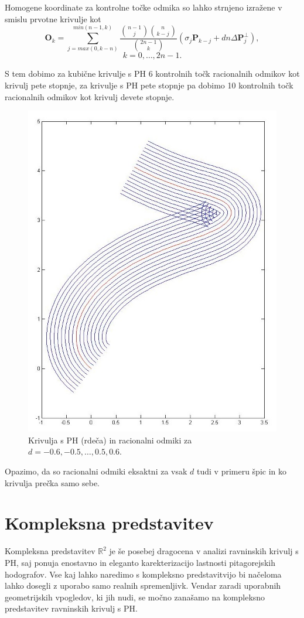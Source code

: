 \documentclass[a4paper]{IEEEtran}
\begin{document}
	Homogene koordinate za kontrolne točke odmika so lahko strnjeno izražene v smislu prvotne krivulje kot
	$$\textbf{O}_k =\sum^{min (n - 1, k)}_{j = max (0, k - n)}\frac{\binom{n-1}{j}\binom{n}{k-j}}{\binom{2n-1}{k}}(\sigma_j\textbf{P}_{k-j}+dn\Delta\textbf{P}_j^\perp),$$ $$k = 0,\ldots, 2n - 1.$$
	
	S tem dobimo za kubične krivulje s PH 6 kontrolnih točk racionalnih odmikov kot krivulj pete stopnje, za krivulje s PH pete stopnje pa dobimo 10 kontrolnih točk racionalnih odmikov kot krivulj devete stopnje.
	
\begin{center}
\begin{figure}[h]
	\includegraphics[width=0.7\linewidth]{odmik.jpg} 
	\caption{Krivulja s PH (rdeča) in racionalni odmiki za $d=-0.6,-0.5,\ldots,0.5,0.6$.}
	\label{fig:odmik}	
\end{figure}
\end{center}
	
	Opazimo, da so racionalni odmiki eksaktni za vsak $d$ tudi v primeru špic in ko krivulja prečka samo sebe.
	
	
	\section{Kompleksna predstavitev}
	Kompleksna predstavitev $\mathbb{R}^2$ je še posebej dragocena v analizi ravninskih krivulj s PH, saj ponuja enostavno in eleganto karekterizacijo lastnosti pitagorejskih hodografov. Vse kaj lahko naredimo s kompleksno predstavitvijo bi načeloma lahko dosegli z uporabo samo realnih spremenljivk. Vendar zaradi uporabnih geometrijskih vpogledov, ki jih nudi, se močno zanašamo na kompleksno predstavitev ravninskih krivulj s PH.
	
\end{document}
